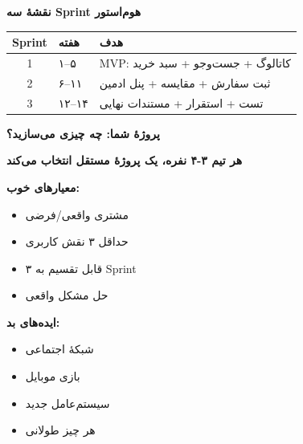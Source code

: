 \documentclass[14pt, a4paper, landscape]{extarticle}
\newcommand{\slide}[1]{%
    \newpage
    \begin{center}
    \begin{minipage}[t]{0.95\textwidth}
    \vspace{0.5cm}
    #1
    \vspace{0.5cm}
    \end{minipage}
    \end{center}
}
\newcommand{\slidetitle}[1]{%
    \begin{center}
        {\LARGE\bfseries\textcolor{primary}{#1}}
    \end{center}
    \vspace{0.5cm}
}
\newcommand{\myaccent}[1]{\textcolor{accent}{#1}}
\begin{document}
\slide{
    \slidetitle{نقشهٔ سه Sprint هوم‌استور}
    \vspace{0.5cm}
    \begin{center}
        \begin{tabular}{clp{6cm}}
            \toprule
            \textbf{Sprint} & \textbf{هفته} & \textbf{هدف} \\
            \midrule
            1 & ۱–۵ & MVP: کاتالوگ + جست‌وجو + سبد خرید \\
            \hline
            2 & ۶–۱۱ & ثبت سفارش + مقایسه + پنل ادمین \\
            \hline
            3 & ۱۲–۱۴ & تست + استقرار + مستندات نهایی \\
            \bottomrule
        \end{tabular}
    \end{center}
}

\slide{
    \slidetitle{پروژهٔ شما: چه چیزی می‌سازید؟}
    \vspace{0.3cm}
    \begin{center}
        {\bfseries هر تیم ۳-۴ نفره، یک پروژهٔ مستقل انتخاب می‌کند}
    \end{center}
    
    \vspace{0.5cm}
    
    \begin{minipage}[t]{0.48\textwidth}
        \begin{minipage}[t]{0.48\textwidth}
            {\bfseries\textcolor{primary}{معیارهای خوب:}}
            \begin{itemize}[itemsep=0.3em]
                \item مشتری واقعی/فرضی
                \item حداقل ۳ نقش کاربری
                \item قابل تقسیم به ۳ Sprint
                \item حل مشکل واقعی
            \end{itemize}
        \end{minipage}
        \begin{minipage}[t]{0.48\textwidth}
            {\bfseries\myaccent{ایده‌های بد:}}
            \begin{itemize}[itemsep=0.3em]
                \item شبکهٔ اجتماعی
                \item بازی موبایل
                \item سیستم‌عامل جدید
                \item هر چیز طولانی
            \end{itemize}
        \end{minipage}
    \end{minipage}
}
\end{document}
